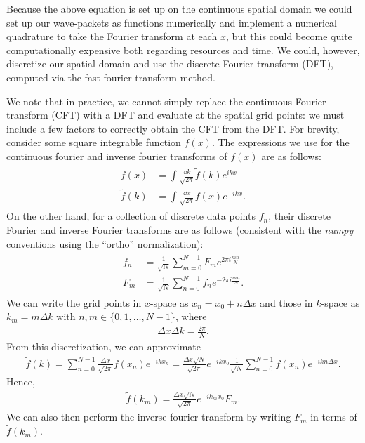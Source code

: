 Because the above equation is set up on the continuous spatial domain we could set up our wave-packets as functions numerically and implement a numerical quadrature to take the Fourier transform at each $x$, but this could become quite computationally expensive both regarding resources and time.
We could, however, discretize our spatial domain and use the discrete Fourier transform (DFT), computed via the fast-fourier transform method.

We note that in practice, we cannot simply replace the continuous Fourier transform (CFT) with a DFT and evaluate at the spatial grid points: we must include a few factors to correctly obtain the CFT from the DFT.
For brevity, consider some square integrable function $f(x)$.
The expressions we use for the continuous fourier and inverse fourier transforms of $f(x)$ are as follows:
\begin{align}
\begin{aligned} 
    f(x) &= \int \frac{\dd{k}}{\sqrt{2 \pi}} \tilde{f}(k) e^{i k x} \\
    \tilde{f}(k) &= \int \frac{\dd{x}}{\sqrt{2 \pi}} f(x) e^{-ikx}
.\end{aligned}
\end{align}
On the other hand, for a collection of discrete data points $f_{n}$, their discrete Fourier and inverse Fourier transforms are as follows (consistent with the \textit{numpy} conventions using the ``ortho'' normalization):
\begin{align}
\begin{aligned} 
    f_{n} &= \frac{1}{\sqrt{N}} \sum_{m=0}^{N-1} F_{m} e^{2 \pi i \frac{m n}{N}} \\
    F_{m} &= \frac{1}{\sqrt{N}} \sum_{n=0}^{N-1} f_{n} e^{-2 \pi i \frac{m n}{N}}
.\end{aligned}
\end{align}
We can write the grid points in $x$-space as $x_{n} = x_0 + n \Delta x$ and those in $k$-space as $k_{m} = m \Delta k$ with $n,m \in \{ 0,1,\ldots,N-1 \}$, where
\begin{align}
    \Delta x \Delta k = \frac{2 \pi}{N}
.\end{align}
From this discretization, we can approximate
\begin{align}
    \tilde{f}(k) = \sum_{n=0}^{N-1} \frac{\Delta x}{\sqrt{2 \pi}} f(x_{n}) e^{-i k x_{n}} = \frac{\Delta x \sqrt{N}}{\sqrt{2 \pi}} e^{-i k x_0} \frac{1}{\sqrt{N}} \sum_{n=0}^{N-1} f(x_{n}) e^{-i k n \Delta x}
.\end{align}
Hence,
\begin{align}
    \tilde{f}(k_{m}) = \frac{\Delta x \sqrt{N}}{\sqrt{2 \pi}} e^{-i k_{m} x_0} F_{m}
.\end{align}
We can also then perform the inverse fourier transform by writing $F_{m}$ in terms of $\tilde{f}(k_{m})$.

